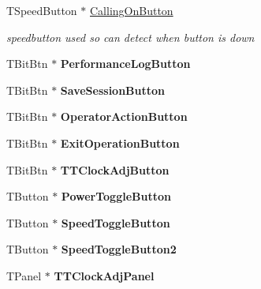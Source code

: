 \begin{DoxyCompactItemize}
\mbox{\label{class_t_interface_a4c3b977862eea5eae2631c9af65ac069}} 
T\+Speed\+Button $\ast$ \mbox{\hyperlink{class_t_interface_a4c3b977862eea5eae2631c9af65ac069}{Calling\+On\+Button}}
\begin{DoxyCompactList}\small\item\em speedbutton used so can detect when button is down \end{DoxyCompactList}\item 
\mbox{\label{class_t_interface_a9244812961d0ebb1001305b0486d23e2}} 
T\+Bit\+Btn $\ast$ {\bfseries Performance\+Log\+Button}
\item 
\mbox{\label{class_t_interface_a1186be2f10c6d71e2f2c50a2fd9e573b}} 
T\+Bit\+Btn $\ast$ {\bfseries Save\+Session\+Button}
\item 
\mbox{\label{class_t_interface_a371dcdcc6f55ffe764796c4d18d4ecfd}} 
T\+Bit\+Btn $\ast$ {\bfseries Operator\+Action\+Button}
\item 
\mbox{\label{class_t_interface_a7f8ee675b1f05ed8711b01f8a97e9164}} 
T\+Bit\+Btn $\ast$ {\bfseries Exit\+Operation\+Button}
\item 
\mbox{\label{class_t_interface_ae6645a1f27a503f98bf153653b3f5783}} 
T\+Bit\+Btn $\ast$ {\bfseries T\+T\+Clock\+Adj\+Button}
\item 
\mbox{\label{class_t_interface_a8c529ad31a99047bff4153a900ec128c}} 
T\+Button $\ast$ {\bfseries Power\+Toggle\+Button}
\item 
\mbox{\label{class_t_interface_aae0a29bdc4382ce1b8c0d3575f50b87d}} 
T\+Button $\ast$ {\bfseries Speed\+Toggle\+Button}
\item 
\mbox{\label{class_t_interface_a88e8165081a94e65e685a0952a8aef08}} 
T\+Button $\ast$ {\bfseries Speed\+Toggle\+Button2}
\item 
\mbox{\label{class_t_interface_aa1cda2e96293955038f417dc2ed73ed8}} 
T\+Panel $\ast$ {\bfseries T\+T\+Clock\+Adj\+Panel}
\item 

\end{DoxyCompactItemize}
